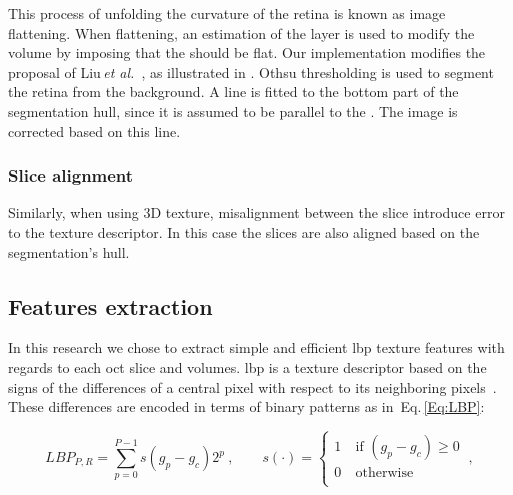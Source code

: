 This process of unfolding the curvature of the retina is known as image flattening. When flattening, an estimation of the \rpe  layer is used to modify the volume by imposing that the \rpe  should be flat.
Our implementation modifies the proposal of Liu\,\textit{et al.}~\cite{Liu2011}, as illustrated in . Othsu thresholding is used to segment the retina from the background. A line is fitted to the bottom part of the segmentation hull, since it is assumed to be parallel to the \rpe. The image is corrected based on this line.

\begin{figure}[t]
  \caption{}
  \label{fig:flatten}
\end{figure}


\subsubsection{Slice alignment}
Similarly, when using 3D texture, misalignment between the slice introduce error to the texture descriptor. In this case the slices are also aligned based on the segmentation's hull.


\subsection{Features extraction}\label{subsec:feaext}
In this research we chose to extract simple and efficient \ac{lbp} texture features with regards to each \ac{oct} slice and volumes.
\ac{lbp} is a texture descriptor based on the signs of the differences of a central pixel with respect to its neighboring pixels~\cite{ojala2002multiresolution}.
These differences are encoded in terms of binary patterns as in~Eq.\,\eqref{Eq:LBP}:

\begin{equation}\label{Eq:LBP}
LBP_{P,R} = \sum_{p=0}^{P-1}s(g_{p} - g_{c})2^{p} \ , \qquad s(\cdot) = \begin{cases}
    1  & \ \text{if } (g_{p} - g_{c}) \geq 0\\
    0  & \ \text{otherwise}\\
  \end{cases} \ ,
\end{equation}

